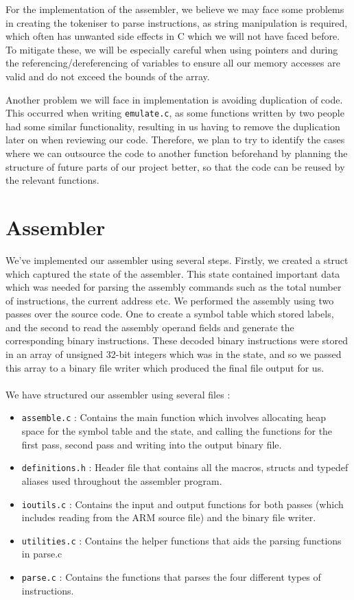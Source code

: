 \documentclass[11pt]{article}
\begin{document}
For the implementation of the assembler, we believe we may face some problems in creating the tokeniser to parse instructions, as string manipulation is required, which often has unwanted side effects in C which we will not have faced before. To mitigate these, we will be especially careful when using pointers and during the referencing/dereferencing of variables to ensure all our memory accesses are valid and do not exceed the bounds of the array.

Another problem we will face in implementation is avoiding duplication of code. This occurred when writing \texttt{emulate.c}, as some functions written by two people had some similar functionality, resulting in us having to remove the duplication later on when reviewing our code. Therefore, we plan to try to identify the cases where we can outsource the code to another function beforehand by planning the structure of future parts of our project better, so that the code can be reused by the relevant functions.
\section{Assembler} 

We've implemented our assembler using several steps. Firstly, we created a struct which captured the state of the assembler. This state contained important data which was needed for parsing the assembly commands such as the total number of instructions, the current address etc. We performed the assembly using two passes over the source code. One to create a symbol table which stored labels, and the second to read the assembly operand fields and generate the corresponding binary instructions. These decoded binary instructions were stored in an array of unsigned 32-bit integers which was in the state, and so we passed this array to a binary file writer which produced the final file output for us.
\\ 
\\
We have structured our assembler using several files :

\begin{itemize}
\item \texttt{assemble.c} : Contains the main function which involves allocating heap space for the symbol table and the state, and calling the functions for the first pass, second pass and writing into the output binary file.
\item \texttt{definitions.h} : Header file that contains all the macros, structs and typedef aliases used throughout the assembler program.
\item \texttt{ioutils.c} : Contains the input and output functions for both passes (which includes reading from the ARM source file) and the binary file writer.
\item \texttt{utilities.c} : Contains the helper functions that aids the parsing functions in parse.c
\item \texttt{parse.c} : Contains the functions that parses the four different types of instructions.
\end{itemize}
\end{document}

